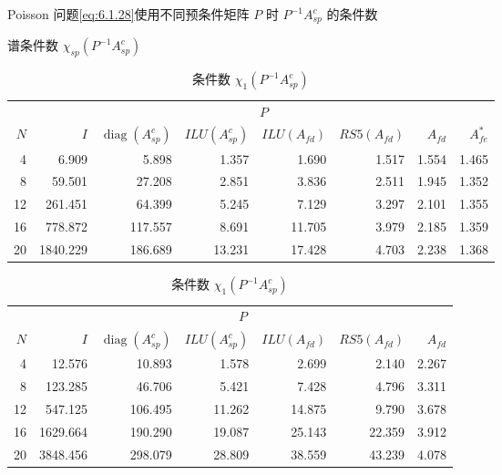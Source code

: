 \begin{table}[!htbp]
  \centering
  \caption{Poisson 问题\eqref{eq:6.1.28}使用不同预条件矩阵 \(P\) 时 \(P^{-1}A_{sp}^c\) 的条件数}\label{tab:6.3.2}
  \begin{subtable}{\linewidth}
    \centering
    \caption{谱条件数 \(\chi_{sp}(P^{-1}A_{sp}^c)\)}\label{tab:6.3.2a}
    \begin{tabular}{rrrrrrrr}
      \toprule
      & \multicolumn{7}{c}{\(P\)}\\
      \cmidrule(lr){2-8}
      \(N\)&\(I\)&\(\operatorname{diag}(A_{sp}^c)\)&\(ILU(A_{sp}^c)\)&\(ILU(A_{fd})\)&\(RS5(A_{fd})\)&\(A_{fd}\)&\(A_{fe}^*\)\\
      \midrule
       4 & 6.909 & 5.898 & 1.357 & 1.690 & 1.517 & 1.554 & 1.465\\
       8 & 59.501 & 27.208 & 2.851 & 3.836 & 2.511 & 1.945 & 1.352\\
      12 & 261.451 & 64.399 & 5.245 & 7.129 & 3.297 & 2.101 & 1.355\\
      16 & 778.872 & 117.557 & 8.691 & 11.705 & 3.979 & 2.185 & 1.359\\
      20 & 1840.229 & 186.689 & 13.231 & 17.428 & 4.703 & 2.238 & 1.368\\
      \bottomrule
    \end{tabular}
  \end{subtable}\par\medskip
  \begin{subtable}{\linewidth}
    \centering
    \caption{条件数 \(\chi_1(P^{-1}A_{sp}^c)\)}\label{tab:6.3.2b}
    \begin{tabular}{rrrrrrr}
      \toprule
      & \multicolumn{6}{c}{\(P\)}\\
      \cmidrule(lr){2-7}
      \(N\)&\(I\)&\(\operatorname{diag}(A_{sp}^c)\)&\(ILU(A_{sp}^c)\)&\(ILU(A_{fd})\)&\(RS5(A_{fd})\)&\(A_{fd}\)\\
      \midrule
       4 & 12.576 & 10.893 & 1.578 & 2.699 & 2.140 & 2.267\\
       8 & 123.285 & 46.706 & 5.421 & 7.428 & 4.796 & 3.311\\
      12 & 547.125 & 106.495 & 11.262 & 14.875 & 9.790 & 3.678\\
      16 & 1629.664 & 190.290 & 19.087 & 25.143 & 22.359 & 3.912\\
      20 & 3848.456 & 298.079 & 28.809 & 38.559 & 43.239 & 4.078\\
      \bottomrule
    \end{tabular}
  \end{subtable}
\end{table}

